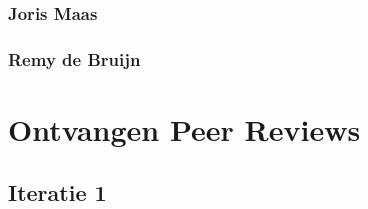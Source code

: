 \documentclass[a4paper]{report}
\begin{document}
\subsubsection{Joris Maas}
\noindent
\begin{minipage}{\textwidth}
  \centering
\end{minipage}

\subsubsection{Remy de Bruijn}


\section{Ontvangen Peer Reviews}
\subsection{Iteratie 1}
\end{document}
